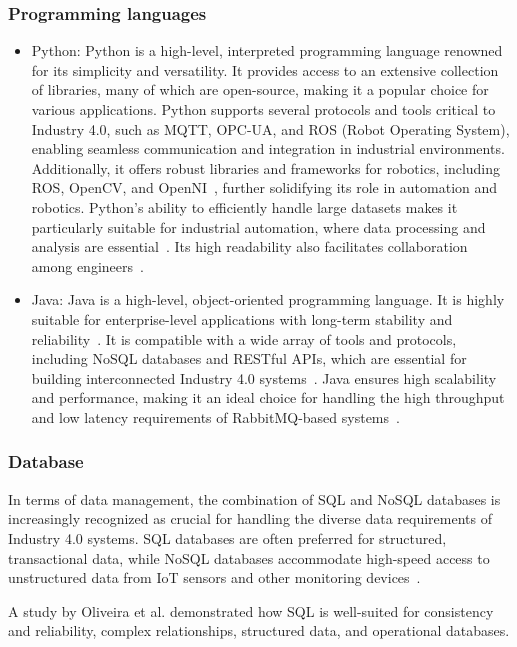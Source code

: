 \documentclass[conference]{IEEEtran}
\begin{document}
\subsubsection{Programming languages}
\begin{itemize}
    \item Python: Python is a high-level, interpreted programming language renowned for its simplicity and versatility. It provides access to an extensive collection of libraries, many of which are open-source, making it a popular choice for various applications. Python supports several protocols and tools critical to Industry 4.0, such as MQTT, OPC-UA, and ROS (Robot Operating System), enabling seamless communication and integration in industrial environments. Additionally, it offers robust libraries and frameworks for robotics, including ROS, OpenCV, and OpenNI~\cite{b9}, further solidifying its role in automation and robotics. Python's ability to efficiently handle large datasets makes it particularly suitable for industrial automation, where data processing and analysis are essential~\cite{b10}. Its high readability also facilitates collaboration among engineers~\cite{b10}.
    \item Java: Java is a high-level, object-oriented programming language. It is highly suitable for enterprise-level applications with long-term stability and reliability~\cite{b13}. It is compatible with a wide array of tools and protocols, including NoSQL databases and RESTful APIs, which are essential for building interconnected Industry 4.0 systems~\cite{b13}. Java ensures high scalability and performance, making it an ideal choice for handling the high throughput and low latency requirements of RabbitMQ-based systems~\cite{b13}.
\end{itemize}

\subsubsection{Database}
In terms of data management, the combination of SQL and NoSQL databases is increasingly recognized as crucial for handling the diverse data requirements of Industry 4.0 systems. SQL databases are often preferred for structured, transactional data, while NoSQL databases accommodate high-speed access to unstructured data from IoT sensors and other monitoring devices~\cite{b2}. 

A study by Oliveira et al. demonstrated how SQL is well-suited for consistency and reliability, complex relationships, structured data, and operational databases.
\end{document}

